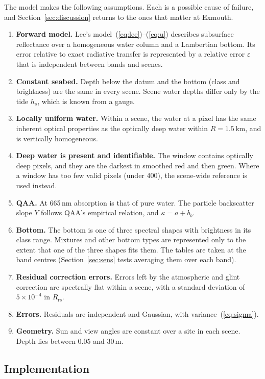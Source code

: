 \documentclass[remotesensing,article,submit,pdftex]{Definitions/mdpi}
\begin{document}
The model makes the following assumptions. Each is a possible cause of failure, and Section~\ref{sec:discussion} returns to the ones that matter at Exmouth.
\begin{enumerate}[label=A\arabic*.]
\item \textbf{Forward model.} Lee's model~(\ref{eq:lee})--(\ref{eq:u}) describes subsurface reflectance over a homogeneous water column and a Lambertian bottom. Its error relative to exact radiative transfer is represented by a relative error $\varepsilon$ that is independent between bands and scenes.
\item \textbf{Constant seabed.} Depth below the datum and the bottom (class and brightness) are the same in every scene. Scene water depths differ only by the tide $h_s$, which is known from a gauge.
\item \textbf{Locally uniform water.} Within a scene, the water at a pixel has the same inherent optical properties as the optically deep water within $R = 1.5$\,km, and is vertically homogeneous.
\item \textbf{Deep water is present and identifiable.} The window contains optically deep pixels, and they are the darkest in smoothed red and then green. Where a window has too few valid pixels (under 400), the scene-wide reference is used instead.
\item \textbf{QAA.} At 665\,nm absorption is that of pure water. The particle backscatter slope $Y$ follows QAA's empirical relation, and $\kappa = a + b_b$.
\item \textbf{Bottom.} The bottom is one of three spectral shapes with brightness in its class range. Mixtures and other bottom types are represented only to the extent that one of the three shapes fits them. The tables are taken at the band centres (Section~\ref{sec:sens} tests averaging them over each band).
\item \textbf{Residual correction errors.} Errors left by the atmospheric and glint correction are spectrally flat within a scene, with a standard deviation of $5 \times 10^{-4}$ in $R_\mathrm{rs}$.
\item \textbf{Errors.} Residuals are independent and Gaussian, with variance~(\ref{eq:sigma}).
\item \textbf{Geometry.} Sun and view angles are constant over a site in each scene. Depth lies between 0.05 and 30\,m.
\end{enumerate}

\subsection{Implementation}\label{sec:impl}
\end{document}
